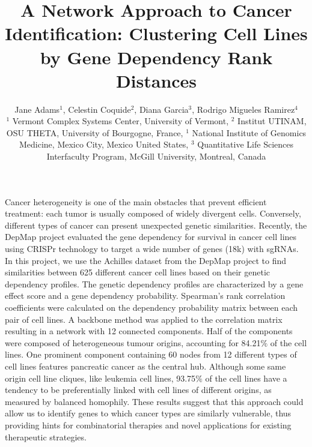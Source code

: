 \documentclass[12pt]{article}
\begin{document}
\title{\normalsize\bf \vspace{-10ex}
A Network Approach to Cancer Identification: Clustering Cell Lines by Gene Dependency Rank Distances}

\begingroup\onehalfspacing
\author{Jane Adams$^1$, Celestin Coquide$^2$, Diana Garcia$^3$, Rodrigo Migueles Ramirez$^4$ \\
\footnotesize
$^1$ Vermont Complex Systems Center, University of Vermont, $^2$ Institut UTINAM, OSU THETA, University of Bourgogne, France, $^1$ National Institute of Genomics Medicine, Mexico City, Mexico  United States,  $^3$ Quantitative Life Sciences Interfaculty Program, McGill University, Montreal, Canada }
\endgroup



\date{\vspace{-5ex}} %

\maketitle

\thispagestyle{empty}
\pagestyle{empty}
Cancer heterogeneity is one of the main obstacles that prevent efficient treatment: each tumor is usually composed of widely divergent cells. Conversely, different types of cancer can present unexpected genetic similarities. Recently, the DepMap project \cite{Tsherniak17} evaluated the gene dependency for survival in cancer cell lines using CRISPr technology to target a wide number of genes (18k) with sgRNAs. In this project, we use the Achilles dataset from the DepMap project to find similarities between 625 different cancer cell lines based on their genetic dependency profiles. The genetic dependency profiles are characterized by a gene effect score and a gene dependency probability. Spearman’s rank correlation coefficients were calculated on the dependency probability matrix between each pair of cell lines. A backbone method  \cite{Serrano09} was applied to the correlation matrix resulting in a network with 12 connected components. Half of the components were composed of heterogeneous tumour origins, accounting for 84.21$\%$ of the cell lines. One prominent component containing 60 nodes from 12 different types of cell lines features pancreatic cancer as the central hub. Although some same origin cell line cliques, like leukemia cell lines, 93.75$\%$ of the cell lines have a tendency to be preferentially linked with cell lines of different origins, as measured by balanced homophily. These results suggest that this approach could allow us to identify genes to which cancer types are similarly vulnerable, thus providing hints for combinatorial therapies and novel applications for existing therapeutic strategies. 
\end{document}
